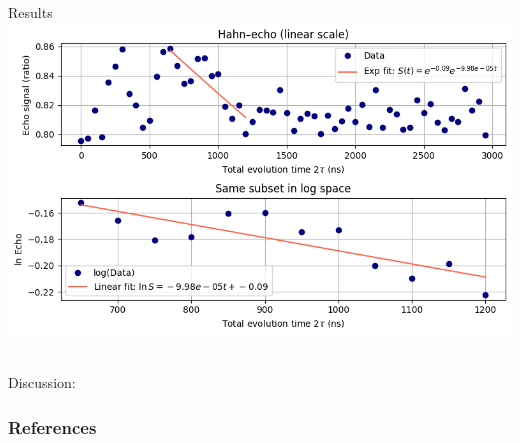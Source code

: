 \documentclass{beamer}
\begin{document}
\begin{frame}{Results}
    \centering
    \includegraphics[width=\linewidth]{presentation/figs/hahn.png}\

    Discussion:
\end{frame}



\begin{frame}[allowframebreaks] %
\frametitle{References}
\end{frame}

\end{document}
